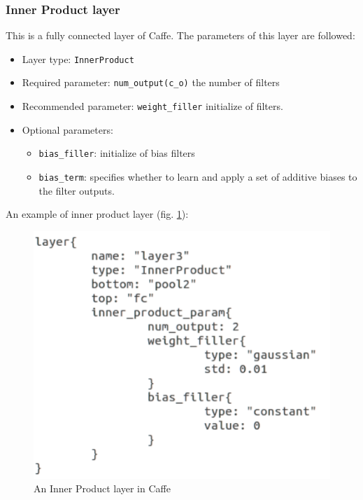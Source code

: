 \subsubsection{Inner Product layer}
This is a fully connected layer of Caffe. The parameters of this layer are followed:
\begin{itemize}
	\item Layer type: \texttt{InnerProduct}
	\item Required parameter: \texttt{num\_output(c\_o)} the number of filters
	\item Recommended parameter: \texttt{weight\_filler} initialize of filters.
	\item Optional parameters:
		\begin{itemize}
			\item \texttt{bias\_filler}: initialize of bias filters
			\item \texttt{bias\_term}: specifies whether to learn and apply a set of additive biases to the filter outputs.
		\end{itemize}
\end{itemize}
An example of inner product layer (fig. \ref{figstinner}):
\begin{figure}[!h]
	\centering
	\includegraphics[scale=0.5]{images/stinner}
	\caption{An Inner Product layer in Caffe}
	\label{figstinner}
\end{figure}
